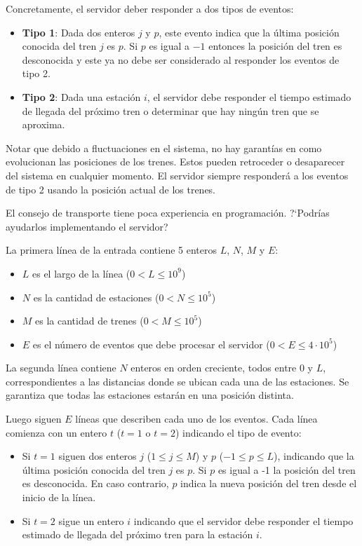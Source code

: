 \documentclass{oci}
\begin{document}
\begin{problemDescription}
  Concretamente, el servidor deber responder a dos tipos
  de eventos:
  \begin{itemize}
    \item \textbf{Tipo 1}: Dada dos enteros $j$ y $p$, este evento
    indica que la última posición conocida del tren $j$ es $p$.
    Si $p$ es igual a $-1$ entonces la posición del tren es desconocida
    y este ya no debe ser considerado al responder los eventos de tipo 2.
    \item \textbf{Tipo 2}: Dada una estación $i$, el servidor debe
    responder el tiempo estimado de llegada del próximo tren o determinar
    que hay ningún tren que se aproxima.
  \end{itemize}

  Notar que debido a fluctuaciones en el sistema, no hay garantías
  en como evolucionan las posiciones de los trenes.
  Estos pueden retroceder o desaparecer del sistema en cualquier momento.
  El servidor siempre responderá a los eventos de tipo 2 usando
  la posición actual de los trenes.

  El consejo de transporte tiene poca experiencia en programación.
  ?`Podrías ayudarlos implementando el servidor?
\end{problemDescription}

\begin{inputDescription}
  La primera línea de la entrada contiene 5 enteros $L$, $N$, $M$ y $E$:
  \begin{itemize}
    \item $L$ es el largo de la línea ($0 < L \leq 10^9$)
    \item $N$ es la cantidad de estaciones ($0 < N \leq 10^5$)
    \item $M$ es la cantidad de trenes ($0 < M \leq 10^5$)
    \item $E$ es el número de eventos que debe procesar el servidor ($0 < E \leq 4\cdot 10^5$)
  \end{itemize}
  La segunda línea contiene $N$ enteros en orden creciente, todos entre 0 y $L$,
  correspondientes a las distancias donde se ubican cada una de las estaciones.
  Se garantiza que todas las estaciones estarán en una posición distinta.

  Luego siguen $E$ líneas que describen cada uno de los eventos.
  Cada línea comienza con un entero $t$ ($t=1$ o $t=2$) indicando el tipo de evento:
  \begin{itemize}
  \item Si $t=1$ siguen dos enteros $j$ ($1\leq j \leq M$) y $p$ ($-1\leq p \leq L$),
  indicando que la última posición conocida del tren $j$ es $p$.
  Si $p$ es igual a -1 la posición del tren es desconocida.
  En caso contrario, $p$ indica la nueva posición del tren desde el inicio
  de la línea.
  \item Si $t=2$ sigue un entero $i$ indicando que el servidor debe responder el tiempo
  estimado de llegada del próximo tren para la estación $i$.
  \end{itemize}

\end{inputDescription}
\end{document}
